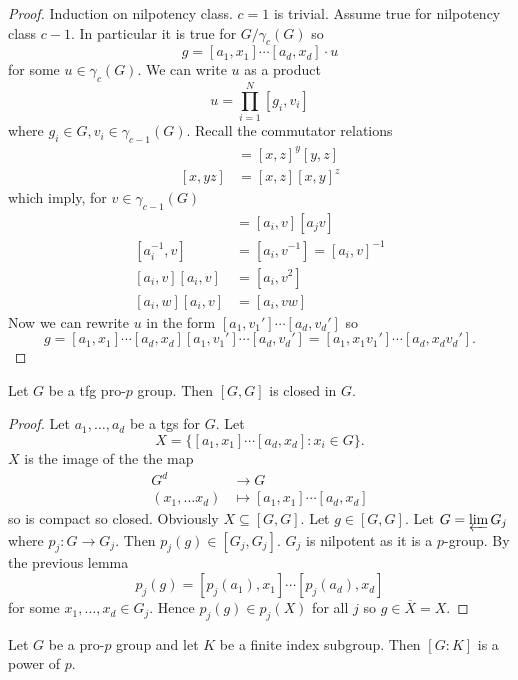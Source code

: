 \documentclass[a4paper]{article}
\begin{document}
\begin{proof}
  Induction on nilpotency class. \(c = 1\) is trivial. Assume true for nilpotency class \(c - 1\). In particular it is true for \(G/\gamma_c(G)\) so
  \[
    g = [a_1, x_1] \cdots [a_d, x_d] \cdot u
  \]
  for some \(u \in \gamma_c(G)\). We can write \(u\) as a product
  \[
    u = \prod_{i = 1}^N [g_i, v_i]
  \]
  where \(g_i \in G, v_i \in \gamma_{c - 1}(G)\). Recall the commutator relations
  \begin{align*}
    [xy, z] &= [x, z]^y [y, z] \\
    [x, yz] &= [x, z] [x, y]^z
  \end{align*}
  which imply, for \(v \in \gamma_{c - 1}(G)\)
  \begin{align*}
    [a_ia_j, v] &= [a_i, v] [a_j v] \\
    [a_i^{-1}, v] &= [a_i, v^{-1}] = [a_i, v]^{-1} \\
    [a_i, v] [a_i, v] &= [a_i, v^2] \\
    [a_i, w] [a_i, v] &= [a_i, vw]
  \end{align*}
  Now we can rewrite \(u\) in the form \([a_1, v_1'] \cdots [a_d, v_d']\) so
  \[
    g = [a_1, x_1] \cdots [a_d, x_d] [a_1, v_1'] \cdots [a_d, v_d']
    = [a_1, x_1v_1'] \cdots [a_d, x_d v_d'].
  \]
\end{proof}

\begin{proposition}
  Let \(G\) be a tfg pro-\(p\) group. Then \([G, G]\) is closed in \(G\).
\end{proposition}

\begin{proof}
  Let \(a_1, \dots, a_d\) be a tgs for \(G\). Let
  \[
    X = \{[a_1, x_1] \cdots [a_d, x_d]: x_i \in G\}.
  \]
  \(X\) is the image of the the map
  \begin{align*}
    G^d &\to G \\
    (x_1, \dots x_d) &\mapsto [a_1, x_1] \cdots [a_d, x_d]
  \end{align*}
  so is compact so closed. Obviously \(X \subseteq [G, G]\). Let \(g \in [G, G]\). Let \(G = \varprojlim G_j\) where \(p_j: G \to G_j\). Then \(p_j(g) \in [G_j, G_j]\). \(G_j\) is nilpotent as it is a \(p\)-group. By the previous lemma
  \[
    p_j(g) = [p_j(a_1), x_1] \cdots [p_j(a_d), x_d]
  \]
  for some \(x_1, \dots, x_d \in G_j\). Hence \(p_j(g) \in p_j(X)\) for all \(j\) so \(g \in \overline X = X\).
\end{proof}

\begin{proposition}
  Let \(G\) be a pro-\(p\) group and let \(K\) be a finite index subgroup. Then \([G: K]\) is a power of \(p\).
\end{proposition}
\end{document}
